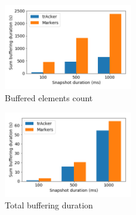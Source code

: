 \begin{figure}[htbp]
  \centering
  \includegraphics[width=0.50\textwidth]{pics/buffering_count_bars.png}
  \caption{Buffered elements count}
  \label{snapshot_buffered}
\end{figure}
\begin{figure}[htbp]
  \centering
  \includegraphics[width=0.50\textwidth]{pics/buffering_sum_duration_bars.png}
  \caption{Total buffering duration}
\end{figure}

